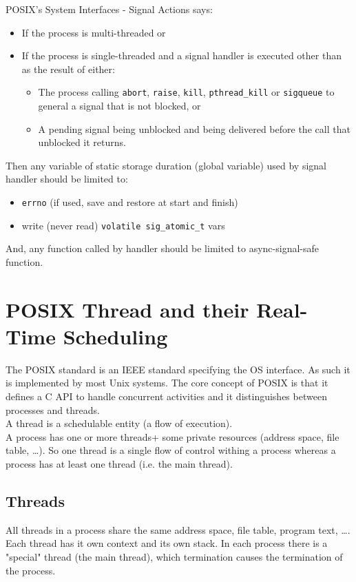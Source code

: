 POSIX's System Interfaces - Signal Actions says:
\begin{itemize}
    \item If the process is multi-threaded or
    \item If the process is single-threaded and a signal handler is executed other than as the result of either:
        \begin{itemize}
            \item The process calling \texttt{abort}, \texttt{raise}, \texttt{kill}, \texttt{pthread\_kill} or \texttt{sigqueue} to general a signal that is not blocked, or
            \item A pending signal being unblocked and being delivered before the call that unblocked it returns.
        \end{itemize}
\end{itemize}
Then any variable of static storage duration (global variable) used by signal handler should be limited to:
\begin{itemize}
    \item \texttt{errno} (if used, save and restore at start and finish)
    \item write (never read) \texttt{volatile sig\_atomic\_t} vars
\end{itemize}
And, any function called by handler should be limited to async-signal-safe function.

\section{POSIX Thread and their Real-Time Scheduling}
The POSIX standard is an IEEE standard specifying the OS interface. As such it is implemented by most Unix systems. The core concept of POSIX is that it defines a C API to handle concurrent activities and it distinguishes between processes and threads.\\
A thread is a schedulable entity (a flow of execution).\\
A process has one or more threads+ some private resources (address space, file table, \dots). So one thread is a single flow of control withing a process whereas a process has at least one thread (i.e. the main thread).

\subsection{Threads}
All threads in a process share the same address space, file table, program text, \dots. Each thread has it own context and its own stack. In each process there is a "special" thread (the main thread), which termination causes the termination of the process.

